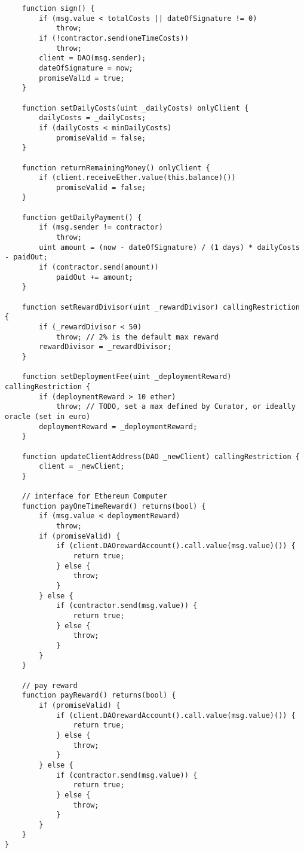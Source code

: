\documentclass[9pt,oneside]{amsart}
\begin{document}
\begin{appendix}
\begin{verbatim}
    function sign() {
        if (msg.value < totalCosts || dateOfSignature != 0)
            throw;
        if (!contractor.send(oneTimeCosts))
            throw;
        client = DAO(msg.sender);
        dateOfSignature = now;
        promiseValid = true;
    }

    function setDailyCosts(uint _dailyCosts) onlyClient {
        dailyCosts = _dailyCosts;
        if (dailyCosts < minDailyCosts)
            promiseValid = false;
    }

    function returnRemainingMoney() onlyClient {
        if (client.receiveEther.value(this.balance)())
            promiseValid = false;
    }

    function getDailyPayment() {
        if (msg.sender != contractor)
            throw;
        uint amount = (now - dateOfSignature) / (1 days) * dailyCosts - paidOut;
        if (contractor.send(amount))
            paidOut += amount;
    }

    function setRewardDivisor(uint _rewardDivisor) callingRestriction {
        if (_rewardDivisor < 50)
            throw; // 2% is the default max reward
        rewardDivisor = _rewardDivisor;
    }

    function setDeploymentFee(uint _deploymentReward) callingRestriction {
        if (deploymentReward > 10 ether)
            throw; // TODO, set a max defined by Curator, or ideally oracle (set in euro)
        deploymentReward = _deploymentReward;
    }

    function updateClientAddress(DAO _newClient) callingRestriction {
        client = _newClient;
    }

    // interface for Ethereum Computer
    function payOneTimeReward() returns(bool) {
        if (msg.value < deploymentReward)
            throw;
        if (promiseValid) {
            if (client.DAOrewardAccount().call.value(msg.value)()) {
                return true;
            } else {
                throw;
            }
        } else {
            if (contractor.send(msg.value)) {
                return true;
            } else {
                throw;
            }
        }
    }

    // pay reward
    function payReward() returns(bool) {
        if (promiseValid) {
            if (client.DAOrewardAccount().call.value(msg.value)()) {
                return true;
            } else {
                throw;
            }
        } else {
            if (contractor.send(msg.value)) {
                return true;
            } else {
                throw;
            }
        }
    }
}
\end{verbatim}



\end{appendix}
\end{document}
